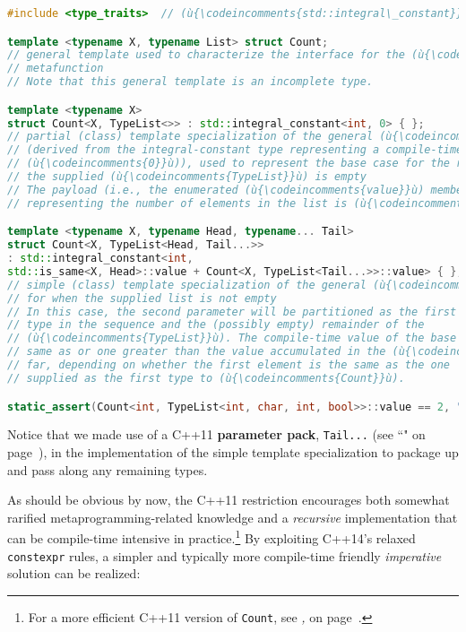 \begin{lstlisting}[language=C++,label={relaxedconstexpr-countcode}]
#include <type_traits>  // (ù{\codeincomments{std::integral\_constant}}ù), (ù{\codeincomments{std::is\_same}}ù)

template <typename X, typename List> struct Count;
// general template used to characterize the interface for the (ù{\codeincomments{Count}}ù)
// metafunction
// Note that this general template is an incomplete type.

template <typename X>
struct Count<X, TypeList<>> : std::integral_constant<int, 0> { };
// partial (class) template specialization of the general (ù{\codeincomments{Count}}ù) template
// (derived from the integral-constant type representing a compile-time
// (ù{\codeincomments{0}}ù)), used to represent the base case for the recursion --- i.e., when
// the supplied (ù{\codeincomments{TypeList}}ù) is empty
// The payload (i.e., the enumerated (ù{\codeincomments{value}}ù) member of the base class)
// representing the number of elements in the list is (ù{\codeincomments{0}}ù).

template <typename X, typename Head, typename... Tail>
struct Count<X, TypeList<Head, Tail...>>
: std::integral_constant<int,
std::is_same<X, Head>::value + Count<X, TypeList<Tail...>>::value> { };
// simple (class) template specialization of the general (ù{\codeincomments{count}}ù) template
// for when the supplied list is not empty
// In this case, the second parameter will be partitioned as the first
// type in the sequence and the (possibly empty) remainder of the
// (ù{\codeincomments{TypeList}}ù). The compile-time value of the base class will be either the
// same as or one greater than the value accumulated in the (ù{\codeincomments{TypeList}}ù) so
// far, depending on whether the first element is the same as the one
// supplied as the first type to (ù{\codeincomments{Count}}ù).

static_assert(Count<int, TypeList<int, char, int, bool>>::value == 2, "");
\end{lstlisting}

\noindent Notice that we made use of a C++11 \textbf{parameter pack},
\texttt{Tail...} (see ``" on page~\pageref{variadictemplate}), in the
implementation of the simple template specialization to package up and
pass along any remaining types.

As should be obvious by now, the C++11 restriction encourages both
somewhat rarified metaprogramming-related knowledge and a
\emph{recursive} implementation that can be compile-time intensive in
practice.{\cprotect\footnote{For a more efficient C++11 version of
\texttt{Count}, see \textit{, } on page~\pageref{constexpr-typelist-count-algorithm}.}} By exploiting C++14's relaxed
\texttt{constexpr} rules, a simpler and typically more compile-time
friendly \emph{imperative} solution can be realized:

